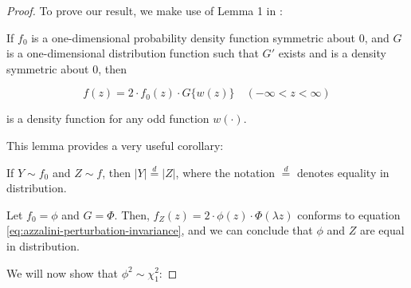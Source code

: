 \documentclass{article}
\begin{document}
\begin{proof}
  To prove our result, we make use of Lemma 1 in \citet{azzalini}:

  \begin{helper-lem}
    If $f_0$ is a one-dimensional probability density function symmetric about
    0, and $G$ is a one-dimensional distribution function such that $G'$ exists
    and is a density symmetric about 0, then

    \begin{equation}
      \label{eq:azzalini-perturbation-invariance}
      f(z) = 2 \cdot f_0(z) \cdot G\{w(z)\} \quad (-\infty < z < \infty)
    \end{equation}

    is a density function for any odd function $w(\cdot)$.
  \end{helper-lem}

  This lemma provides a very useful corollary:

  \begin{helper-cor}
    If $Y \sim f_0$ and $Z \sim f$, then $|Y| \overset{d}{=} |Z|$, where the
    notation $\overset{d}{=}$ denotes equality in distribution.    
  \end{helper-cor}

  Let $f_0 = \phi$ and $G = \Phi$. Then, $f_Z(z) = 2 \cdot \phi(z) \cdot
  \Phi(\lambda z)$ conforms to equation
  \eqref{eq:azzalini-perturbation-invariance}, and we can conclude that $\phi$
  and $Z$ are equal in distribution.


  We will now show that $\phi^2 \sim \chi^2_1$:


\end{proof}
\end{document}
